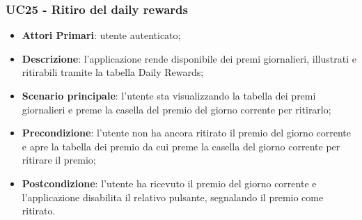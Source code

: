\subsubsection{UC25 - Ritiro del daily rewards}
\begin{itemize}
	\item \textbf{Attori Primari}: utente autenticato;
	\item \textbf{Descrizione}: l'applicazione rende disponibile dei premi giornalieri, illustrati e ritirabili tramite la tabella Daily Rewards;
	\item \textbf{Scenario principale}: l'utente sta visualizzando la tabella dei premi giornalieri e preme la casella del premio del giorno corrente per ritirarlo;
	\item \textbf{Precondizione}: l'utente non ha ancora ritirato il premio del giorno corrente e apre la tabella dei premio da cui preme la casella del giorno corrente per ritirare il premio;
	\item \textbf{Postcondizione}: l'utente ha ricevuto il premio del giorno corrente e l'applicazione disabilita il relativo pulsante, segnalando il premio come ritirato. 
\end{itemize} 